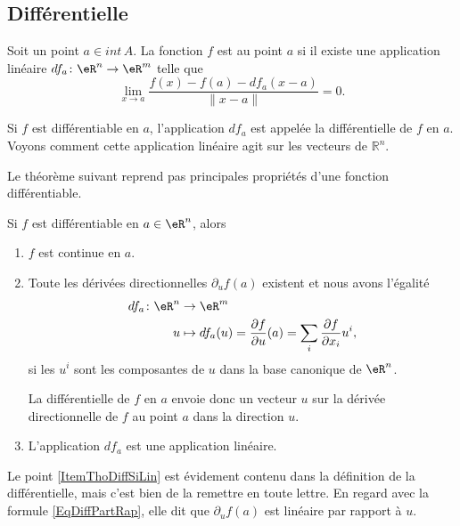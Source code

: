                    \subsection{Différentielle}

\begin{definition}      \label{DefDifferentiablFnRn}
Soit un point $a \in int\,A$. La fonction $f$ est  au point $a$ si il existe une application linéaire $df_a\colon \eR^n\to \eR^m$ telle que 
\begin{equation}        \label{EqDefDiffableT}
    \lim_{x\to a} \frac{f(x) - f(a) - df_a (x-a)}{\|x-a\|}=0.
\end{equation}
\end{definition}

Si $f$ est différentiable en $a$, l'application $df_a$ est appelée la différentielle de $f$ en $a$. Voyons comment cette application linéaire agit sur les vecteurs de $\mathbb{R}^n$.

Le théorème suivant reprend pas principales propriétés d'une fonction différentiable.
\begin{theorem}     \label{ThoRapPropDiffSi}
Si $f$ est différentiable en $a\in\eR^n$, alors
\begin{enumerate}
\item $f$ est continue en $a$.

\item  Toute les dérivées directionnelles $\partial_uf(a)$ existent et nous avons l'égalité
\begin{equation}        \label{EqDiffPartRap}
    \begin{aligned}
        df_a\colon \eR^n&\to \eR^m \\
        u&\mapsto df_a(u)=\frac{ \partial f }{ \partial u }(a)=\sum_i \frac{ \partial f }{ \partial x_i }u^i,
    \end{aligned}
\end{equation}
si les $u^i$ sont les composantes de $u$ dans la base canonique de $\eR^n$.

La différentielle de $f$ en $a$ envoie donc un vecteur $u$ sur la dérivée directionnelle de $f$ au point $a$ dans la direction $u$. 

\item\label{ItemThoDiffSiLin} L'application $df_a$ est une application linéaire.
\end{enumerate}
\end{theorem}
Le point \ref{ItemThoDiffSiLin} est évidement contenu dans la définition de la différentielle, mais c'est bien de la remettre en toute lettre. En regard avec la formule \eqref{EqDiffPartRap}, elle dit que $\partial_uf(a)$ est linéaire par rapport à $u$.

